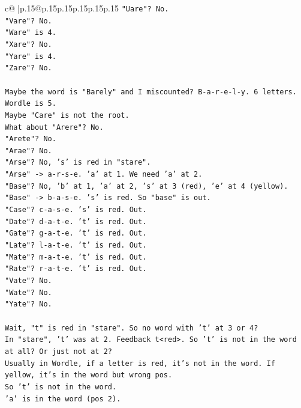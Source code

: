 \documentclass{article}
\begin{document}
{\begin{supertabular}{c@{$\;$}|p{.15\linewidth}@{}p{.15\linewidth}p{.15\linewidth}p{.15\linewidth}p{.15\linewidth}p{.15\linewidth}}
{{{\texttt{"Uare"? No.} \\
\texttt{"Vare"? No.} \\
\texttt{"Ware" is 4.} \\
\texttt{"Xare"? No.} \\
\texttt{"Yare" is 4.} \\
\texttt{"Zare"? No.} \\
\\ 
\texttt{Maybe the word is "Barely" and I miscounted? B{-}a{-}r{-}e{-}l{-}y. 6 letters. Wordle is 5.} \\
\texttt{Maybe "Care" is not the root.} \\
\texttt{What about "Arere"? No.} \\
\texttt{"Arete"? No.} \\
\texttt{"Arae"? No.} \\
\texttt{"Arse"? No, 's' is red in "stare".} \\
\texttt{"Arse" {-}> a{-}r{-}s{-}e. 'a' at 1. We need 'a' at 2.} \\
\texttt{"Base"? No, 'b' at 1, 'a' at 2, 's' at 3 (red), 'e' at 4 (yellow).} \\
\texttt{"Base" {-}> b{-}a{-}s{-}e. 's' is red. So "base" is out.} \\
\texttt{"Case"? c{-}a{-}s{-}e. 's' is red. Out.} \\
\texttt{"Date"? d{-}a{-}t{-}e. 't' is red. Out.} \\
\texttt{"Gate"? g{-}a{-}t{-}e. 't' is red. Out.} \\
\texttt{"Late"? l{-}a{-}t{-}e. 't' is red. Out.} \\
\texttt{"Mate"? m{-}a{-}t{-}e. 't' is red. Out.} \\
\texttt{"Rate"? r{-}a{-}t{-}e. 't' is red. Out.} \\
\texttt{"Vate"? No.} \\
\texttt{"Wate"? No.} \\
\texttt{"Yate"? No.} \\
\\ 
\texttt{Wait, "t" is red in "stare". So no word with 't' at 3 or 4?} \\
\texttt{In "stare", 't' was at 2. Feedback t<red>. So 't' is not in the word at all? Or just not at 2?} \\
\texttt{Usually in Wordle, if a letter is red, it's not in the word. If yellow, it's in the word but wrong pos.} \\
\texttt{So 't' is not in the word.} \\
\texttt{'a' is in the word (pos 2).} \\
}}}
\end{supertabular}}
\end{document}
